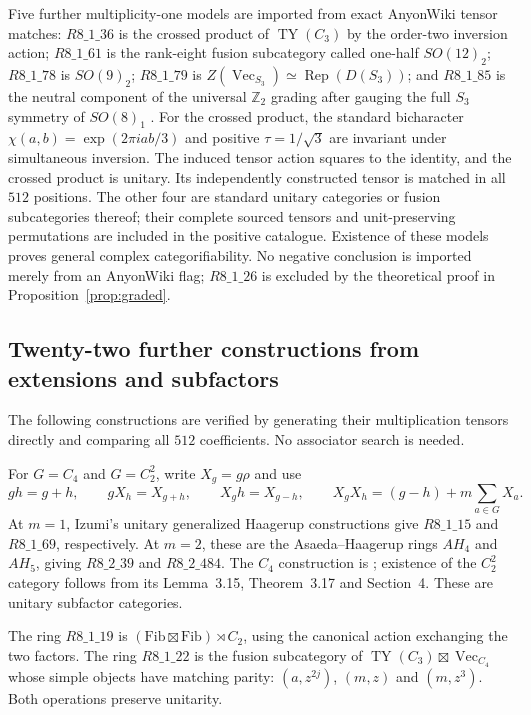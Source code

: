 \documentclass[11pt,reqno]{amsart}
\theoremstyle{definition}
\theoremstyle{remark}
\newcommand{\Z}{\mathbb Z}
\newcommand{\Rep}{\operatorname{Rep}}
\renewcommand{\Vec}{\operatorname{Vec}}
\begin{document}
{\small\par}
Five further multiplicity-one models are imported from exact AnyonWiki
tensor matches: $R8\_1\_36$ is the crossed product of
$\operatorname{TY}(C_3)$ by the order-two inversion action;
$R8\_1\_61$ is the rank-eight fusion subcategory called
one-half $SO(12)_2$; $R8\_1\_78$ is $SO(9)_2$;
$R8\_1\_79$ is $Z(\Vec_{S_3})\simeq\Rep(D(S_3))$; and
$R8\_1\_85$ is the neutral component of the universal $\Z_2$
grading after gauging the full $S_3$ symmetry of $SO(8)_1$
\cite{AnyonWiki2026,Gauging}.
For the crossed product, the standard bicharacter
$\chi(a,b)=\exp(2\pi i ab/3)$ and positive
$\tau=1/\sqrt3$ are invariant under simultaneous inversion.
The induced tensor action squares to the identity, and the crossed
product is unitary. Its independently constructed tensor is matched
in all $512$ positions. The other four are standard unitary categories
or fusion subcategories thereof; their complete sourced tensors and
unit-preserving permutations are included in the positive catalogue.
Existence of these models proves general complex categorifiability.
No negative conclusion is imported merely from an AnyonWiki flag;
$R8\_1\_26$ is excluded by the theoretical proof in
Proposition~\ref{prop:graded}.

\subsection{Twenty-two further constructions from extensions and subfactors}
The following constructions are verified by generating their multiplication tensors directly and comparing all $512$ coefficients. No associator search is needed.

For $G=C_4$ and $G=C_2^2$, write $X_g=g\rho$ and use
\[
gh=g+h,\qquad gX_h=X_{g+h},\qquad X_gh=X_{g-h},\qquad
X_gX_h=(g-h)+m\sum_{a\in G}X_a.
\]
At $m=1$, Izumi's unitary generalized Haagerup constructions \cite[Section~9]{Izumi3n} give $R8\_1\_15$ and $R8\_1\_69$, respectively. At $m=2$, these are the Asaeda--Haagerup rings $AH_4$ and $AH_5$, giving $R8\_2\_39$ and $R8\_2\_484$. The $C_4$ construction is \cite[Theorem~4.9]{AH}; existence of the $C_2^2$ category follows from its Lemma~3.15, Theorem~3.17 and Section~4. These are unitary subfactor categories.

The ring $R8\_1\_19$ is $(\mathrm{Fib}\boxtimes\mathrm{Fib})\rtimes C_2$, using the canonical action exchanging the two factors. The ring $R8\_1\_22$ is the fusion subcategory of $\operatorname{TY}(C_3)\boxtimes\Vec_{C_4}$ whose simple objects have matching parity: $(a,z^{2j})$, $(m,z)$ and $(m,z^3)$. Both operations preserve unitarity.
\end{document}
